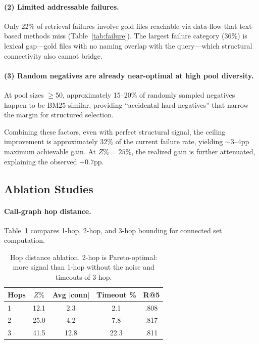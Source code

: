 \documentclass[11pt,a4paper]{article}
\begin{document}
\paragraph{(2) Limited addressable failures.}
Only 22\% of retrieval failures involve gold files reachable via data-flow that text-based methods miss (Table~\ref{tab:failure}).
The largest failure category (36\%) is lexical gap---gold files with no naming overlap with the query---which structural connectivity also cannot bridge.

\paragraph{(3) Random negatives are already near-optimal at high pool diversity.}
At pool sizes $\geq$50, approximately 15--20\% of randomly sampled negatives happen to be BM25-similar, providing ``accidental hard negatives'' that narrow the margin for structured selection.

Combining these factors, even with perfect structural signal, the ceiling improvement is approximately $32\%$ of the current failure rate, yielding $\sim$3--4pp maximum achievable gain.
At $Z\%{=}25\%$, the realized gain is further attenuated, explaining the observed $+0.7$pp.

\subsection{Ablation Studies}

\paragraph{Call-graph hop distance.}
Table~\ref{tab:hop} compares 1-hop, 2-hop, and 3-hop bounding for connected set computation.

\begin{table}[t]
\centering
\small
\begin{tabular}{lcccc}
\toprule
\textbf{Hops} & \textbf{$Z\%$} & \textbf{Avg $|$conn$|$} & \textbf{Timeout \%} & \textbf{R@5} \\
\midrule
1 & 12.1 & 2.3 & 2.1 & .808 \\
2 & 25.0 & 4.2 & 7.8 & .817 \\
3 & 41.5 & 12.8 & 22.3 & .811 \\
\bottomrule
\end{tabular}
\caption{Hop distance ablation. 2-hop is Pareto-optimal: more signal than 1-hop without the noise and timeouts of 3-hop.}
\label{tab:hop}
\end{table}
\end{document}
